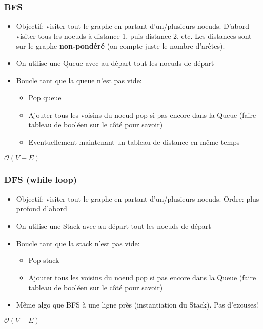 \documentclass[8pt,aspectratio=169]{beamer}
\begin{document}
\begin{frame}
\frametitle{BFS}
\begin{itemize}
	\item Objectif: visiter tout le graphe en partant d'un/plusieurs noeuds. D'abord visiter tous les noeuds à distance 1, puis distance 2, etc. Les distances sont sur le graphe \textbf{non-pondéré} (on compte juste le nombre d'arêtes).
	\item On utilise une Queue avec au départ tout les noeuds de départ
	\item Boucle tant que la queue n'est pas vide:
		\begin{itemize}
			\item Pop queue
			\item Ajouter tous les voisins du noeud pop si pas encore dans la Queue (faire tableau de booléen sur le côté pour savoir)
			\item Eventuellement maintenant un tableau de distance en même temps
		\end{itemize}
\end{itemize}
$\mathcal{O}(V+E)$
\end{frame}

\begin{frame}
\frametitle{DFS (while loop)}
\begin{itemize}
	\item Objectif: visiter tout le graphe en partant d'un/plusieurs noeuds. Ordre: plus profond d'abord
	\item On utilise une Stack avec au départ tout les noeuds de départ
	\item Boucle tant que la stack n'est pas vide:
	\begin{itemize}
		\item Pop stack
		\item Ajouter tous les voisins du noeud pop si pas encore dans la Queue (faire tableau de booléen sur le côté pour savoir)
	\end{itemize}
	\item Même algo que BFS à une ligne près (instantiation du Stack). Pas d'excuses!
\end{itemize}
$\mathcal{O}(V+E)$
\end{frame}
\end{document}
